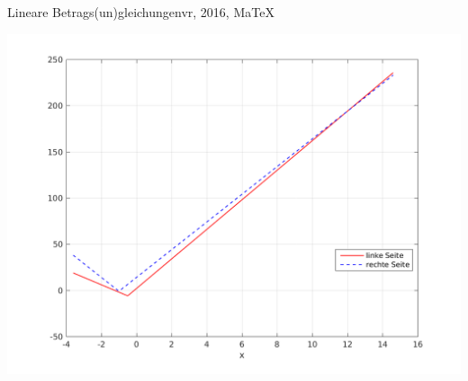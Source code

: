 \begin{MAufgabe}{Lineare Betrags(un)gleichungen}{vr, 2016, MaTeX}
 \begin{center}
 \includegraphics[width=0.8\linewidth]{Abb_zur_Ag_autogenerated_abs_1.png} \end{center}
 
\else\relax\fi
 \end{MAufgabe}